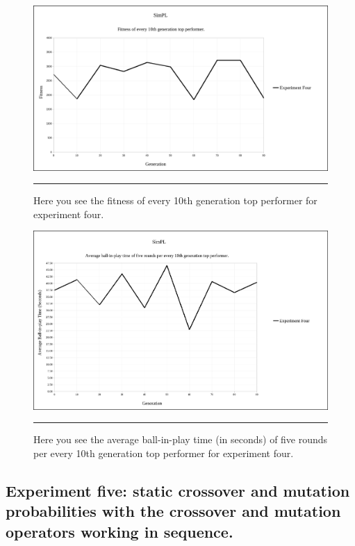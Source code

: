 \begin{figure}[htbp]  
  \centering
  \includegraphics[width=5in]{../Figures/Chapter3/exp4_10_tops.png}
  \rule{35em}{0.5pt}
  \caption[Experiment Four Top Performers]{Here you see the fitness of every 10th generation top performer for experiment four.}
  \label{fig:exp4_10_tops}
\end{figure}

\begin{figure}[htbp]  
  \centering
  \includegraphics[width=5in]{../Figures/Chapter3/exp4_10_tops_times.png}
  \rule{35em}{0.5pt}
  \caption[Experiment Four Top Performers Tournament]{Here you see the average ball-in-play time (in seconds) of five rounds per every 10th generation top performer for experiment four.}
  \label{fig:exp4_10_tops_times}
\end{figure}

\subsection[Experiment Five]{Experiment five: static crossover and mutation probabilities with the crossover and mutation operators working in sequence.}

